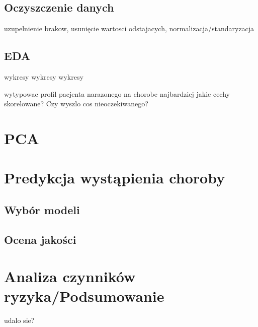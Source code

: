 \documentclass[onecolumn,12pt]{article}
\begin{document}
\subsection{Oczyszczenie danych}
uzupelnienie brakow, usunięcie wartosci odstajacych, normalizacja/standaryzacja



\subsection{EDA}
wykresy wykresy wykresy

wytypowac profil pacjenta narazonego na chorobe najbardziej
jakie cechy skorelowane? Czy wyszlo cos nieoczekiwanego?


\section{PCA}
\section{Predykcja wystąpienia choroby}
\subsection{Wybór modeli}
\subsection{Ocena jakości}
\section{Analiza czynników ryzyka/Podsumowanie}
udalo sie? 

\begin{thebibliography}{9}
\end{thebibliography}
\end{document}
